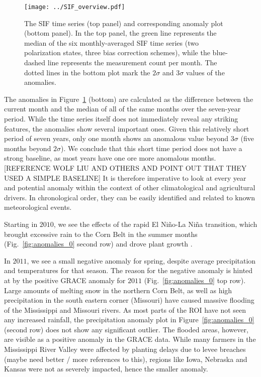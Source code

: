 \documentclass[preprint, a4paper, 10pt, times]{elsarticle}
\begin{document}
\begin{figure}[htbp]
\centering
\texttt{[image: ../SIF\_overview.pdf]}
\caption{The SIF time series (top panel) and corresponding anomaly plot (bottom panel). In the top panel, the green line represents the median of the six monthly-averaged SIF time series (two polarization states, three bias correction schemes), while the blue-dashed line represents the measurement count per month. The dotted lines in the bottom plot mark the $2\sigma$ and $3\sigma$ values of the anomalies.}
\label{fig:sif_ts}
\end{figure}

The anomalies in Figure~\ref{fig:sif_ts} (bottom) are calculated as the difference between the current month and the median of all of the same months over the seven-year period. While the time series itself does not immediately reveal any striking features, the anomalies show several important ones. Given this relatively short period of seven years, only one month shows an anomalous value beyond $3\sigma$ (five months beyond $2\sigma$). We conclude that this short time period does not have a strong baseline, as most years have one ore more anomalous months. [REFERENCE WOLF LIU AND OTHERS AND POINT OUT THAT THEY USED A SIMPLE BASELINE] It is therefore imperative to look at every year and potential anomaly within the context of other climatological and agricultural drivers. In chronological order, they can be easily identified and related to known meteorological events. 

Starting in $2010$, we see the effects of the rapid El Ni\~no-La Ni\~na transition, which brought excessive rain to the Corn Belt in the summer months (Fig.~\ref{fig:anomalies_0} second row) and drove plant growth \citep{USDA2010}.

In $2011$, we see a small negative anomaly for spring, despite average precipitation and temperatures for that season. The reason for the negative anomaly is hinted at by the positive GRACE anomaly for $2011$ (Fig.~\ref{fig:anomalies_0} top row). Large amounts of melting snow in the northern Corn Belt, as well as high precipitation in the south eastern corner (Missouri) have caused massive flooding of the Mississippi and Missouri rivers. As most parts of the ROI have not seen any increased rainfall, the precipitation anomaly plot in Figure~\ref{fig:anomalies_0} (second row) does not show any significant outlier. The flooded areas, however, are visible as a positive anomaly in the GRACE data. While many farmers in the Mississippi River Valley were affected by planting delays due to levee breaches \citep{olson2012impacts} (maybe need better / more references to this), regions like Iowa, Nebraska and Kansas were not as severely impacted, hence the smaller anomaly. 
\end{document}
